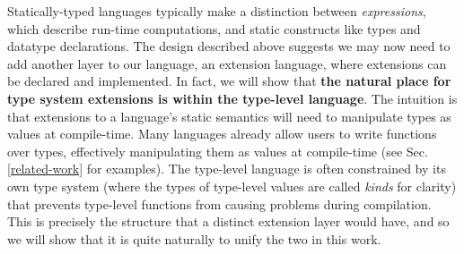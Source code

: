 \documentclass{llncs}
\begin{document}
Statically-typed languages typically make a distinction between \emph{expressions}, which describe run-time computations, and static constructs like types and datatype declarations. The design described above suggests we may now need to add another layer to our language, an {extension language}, where extensions can be declared and implemented. In fact, we will show that \textbf{the natural place for type system extensions is within the type-level language}. The intuition is that extensions to a language's static semantics will need to manipulate types as values at compile-time. Many languages already allow users to write functions over types, effectively manipulating them as values at compile-time (see Sec. \ref{related-work} for examples). The type-level language is often constrained by its own type system (where the types of type-level values are called \emph{kinds} for clarity) that prevents type-level functions from causing problems during compilation. This is precisely the structure that a distinct extension layer would have, and so we will show that it is quite naturally to unify the two in this work.
\end{document}
